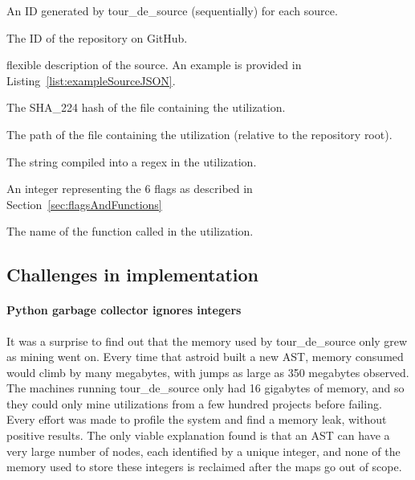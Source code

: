 \begin{description} \itemsep -1pt
\item[uniqueSourceID] An ID generated by tour\_de\_source (sequentially) for each source.
\item[repoID] The ID of the repository on GitHub.
\item[sourceJSON] flexible description of the source.  An example is provided in Listing~\ref{list:exampleSourceJSON}.
\item[fileHash] The SHA\_224 hash of the file containing the utilization.
\item[filePath] The path of the file containing the utilization (relative to the repository root).
\item[pattern] The string compiled into a regex in the utilization.
\item[flags] An integer representing the 6 flags as described in Section~\ref{sec:flagsAndFunctions}
\item[regexFunction] The name of the function called in the utilization.
\end{description}

\subsection*{Challenges in implementation}
\label{app:miningChallenges}

\paragraph{Python garbage collector ignores integers}  It was a surprise to find out that the memory used by tour\_de\_source only grew as mining went on.  Every time that astroid built a new AST, memory consumed would climb by many megabytes, with jumps as large as 350 megabytes observed.  The machines running tour\_de\_source only had 16 gigabytes of memory, and so they could only mine utilizations from a few hundred projects before failing.  Every effort was made to profile the system and find a memory leak, without positive results.  The only viable explanation found is that an AST can have a very large number of nodes, each identified by a unique integer, and none of the memory used to store these integers is reclaimed after the maps go out of scope.

